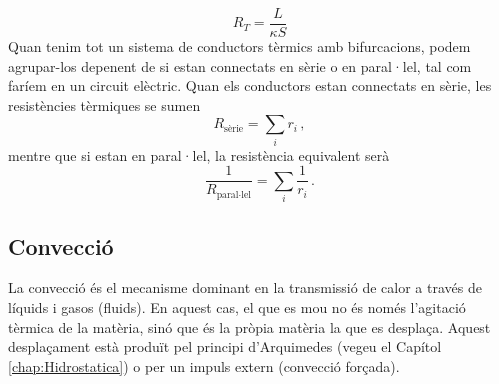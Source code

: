 \documentclass[12pt]{book}
\begin{document}
%
\begin{equation}
    R_T = \frac{L}{\kappa S}
\end{equation}
%
Quan tenim tot un sistema de conductors tèrmics amb bifurcacions, podem agrupar-los depenent de si estan connectats en sèrie o en paral·lel, tal com faríem en un circuit elèctric. Quan els conductors estan connectats en sèrie, les resistències tèrmiques se sumen 
%
\begin{equation}
    R_\text{sèrie} = \sum_i r_i \, ,
\end{equation}
%
mentre que si estan en paral·lel, la resistència equivalent serà
%
\begin{equation}
    \frac{1}{R_\text{paral·lel}} = \sum_i \frac{1}{r_i} \, .
\end{equation}
%

\subsection{Convecció}

La convecció és el mecanisme dominant en la transmissió de calor a través de líquids i gasos (fluids). En aquest cas, el que es mou no és només l'agitació tèrmica de la matèria, sinó que és la pròpia matèria la que es desplaça. Aquest desplaçament està produït pel principi d'Arquimedes (vegeu el Capítol \ref{chap:Hidrostatica}) o per un impuls extern (convecció forçada). 
\end{document}
